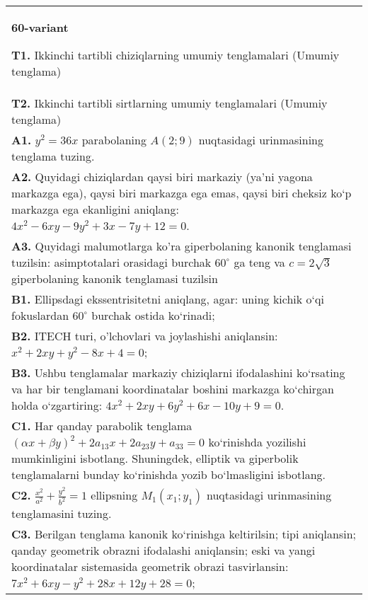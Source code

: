 \documentclass{article}
\begin{document}
\begin{tabular}{m{17cm}}
\textbf{60-variant}
\newline

\textbf{T1.} Ikkinchi tartibli chiziqlarning umumiy tenglamalari (Umumiy tenglama) \\
\textbf{T2.} Ikkinchi tartibli sirtlarning umumiy tenglamalari (Umumiy tenglama) \\
\textbf{A1.} $y^2=36 x$ parabolaning $A(2 ; 9)$ nuqtasidagi urinmasining tenglama tuzing. \\
\textbf{A2.} Quyidagi chiziqlardan qaysi biri markaziy (ya’ni yagona markazga ega), qaysi biri markazga ega emas, qaysi biri cheksiz ko‘p markazga ega ekanligini aniqlang: $4 x^2-6 x y-9 y^2+3 x-7 y+12=0$. \\
\textbf{A3.} Quyidagi malumotlarga ko'ra giperbolaning kanonik tenglamasi tuzilsin: asimptotalari orasidagi burchak $60^{\circ}$ ga teng va $c=2 \sqrt{3}$ giperbolaning kanonik tenglamasi tuzilsin \\
\textbf{B1.} Ellipsdagi ekssentrisitetni aniqlang, agar: uning kichik o‘qi fokuslardan $60^{\circ}$ burchak ostida ko‘rinadi; \\
\textbf{B2.} ITECH turi, o'lchovlari va joylashishi aniqlansin: $x^2+2 x y+y^2-8 x+4=0$; \\
\textbf{B3.} Ushbu tenglamalar markaziy chiziqlarni ifodalashini ko‘rsating va har bir tenglamani koordinatalar boshini markazga ko‘chirgan holda o‘zgartiring: $4 x^2+2 x y+6 y^2+6 x-10 y+9=0$. \\
\textbf{C1.} Har qanday parabolik tenglama $ (\alpha x+\beta y) ^2+2a_{13}x+2a_{23}y+a_{33}=0$ ko‘rinishda yozilishi mumkinligini isbotlang. Shuningdek, elliptik va giperbolik tenglamalarni bunday ko‘rinishda yozib bo‘lmasligini isbotlang. \\
\textbf{C2.} $\frac{x^2}{a^2}+\frac{y^2}{b^2}=1$ ellipsning $M_1(x_1; y_1)$ nuqtasidagi urinmasining tenglamasini tuzing. \\
\textbf{C3.} Berilgan tenglama kanonik ko‘rinishga keltirilsin; tipi aniqlansin; qanday geometrik obrazni ifodalashi aniqlansin; eski va yangi koordinatalar sistemasida geometrik obrazi tasvirlansin: $7 x^2+6 x y-y^2+28 x+12 y+28=0$; \\

\end{tabular}
\vspace{1cm}
\end{document}

